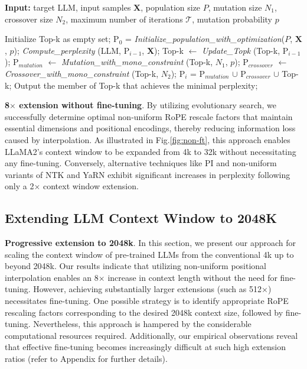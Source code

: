 \begin{algorithm}[t]
	\small
	\caption{The search algorithm}
	\textbf{Input:} target LLM, input samples $\mathbf{X}$, population size $P$, mutation size $N_1$, crossover size $N_2$, maximum number of iterations $\mathcal{T}$, mutation probability $p$\\

	\begin{algorithmic}[1]
		\label{alg:search}
		\STATE Initialize Top-k as empty set;	
		\STATE $\text{P}_0$ = \textit{Initialize\_population\_with\_optimization}($P$, $\mathbf{X}$, $p$); 
		\STATE \textit{Compute\_perplexity} (LLM, $\text{P}_{i-1}$, $\mathbf{X}$);
		\STATE  Top-k $\gets$ \textit{Update\_Topk} (Top-k, $\text{P}_{i-1}$);
		\STATE $\text{P}_{mutation}$ $\gets$ \textit{Mutation\_with\_mono\_constraint} (Top-k, $N_1$, $p$); 
		\STATE $\text{P}_{crossover}$ $\gets$ \textit{Crossover\_with\_mono\_constraint} (Top-k, $N_2$);
		\STATE $\text{P}_i$ = $\text{P}_{mutation}$ $\cup$ $\text{P}_{crossover}$ $\cup$ Top-k;
		\ENDFOR
		\STATE Output the member of Top-k that achieves the minimal perplexity;
	\end{algorithmic}
\end{algorithm}

\textbf{8$\times$ extension without fine-tuning}. By utilizing evolutionary search, we successfully determine optimal non-uniform RoPE rescale factors that maintain essential dimensions and positional encodings, thereby reducing information loss caused by interpolation. As illustrated in Fig.\ref{fig:non-ft}, this approach enables LLaMA2’s context window to be expanded from 4k to 32k without necessitating any fine-tuning. Conversely, alternative techniques like PI and non-uniform variants of NTK and YaRN exhibit significant increases in perplexity following only a 2$\times$ context window extension.

\subsection{Extending LLM Context Window to 2048K}
\label{sec:extendto2048k}

\textbf{Progressive extension to 2048k}. In this section, we present our approach for scaling the context window of pre-trained LLMs from the conventional 4k up to beyond 2048k. Our results indicate that utilizing non-uniform positional interpolation enables an 8$\times$ increase in context length without the need for fine-tuning. However, achieving substantially larger extensions (such as 512$\times$) necessitates fine-tuning. One possible strategy is to identify appropriate RoPE rescaling factors corresponding to the desired 2048k context size, followed by fine-tuning. Nevertheless, this approach is hampered by the considerable computational resources required. Additionally, our empirical observations reveal that effective fine-tuning becomes increasingly difficult at such high extension ratios (refer to Appendix for further details).

